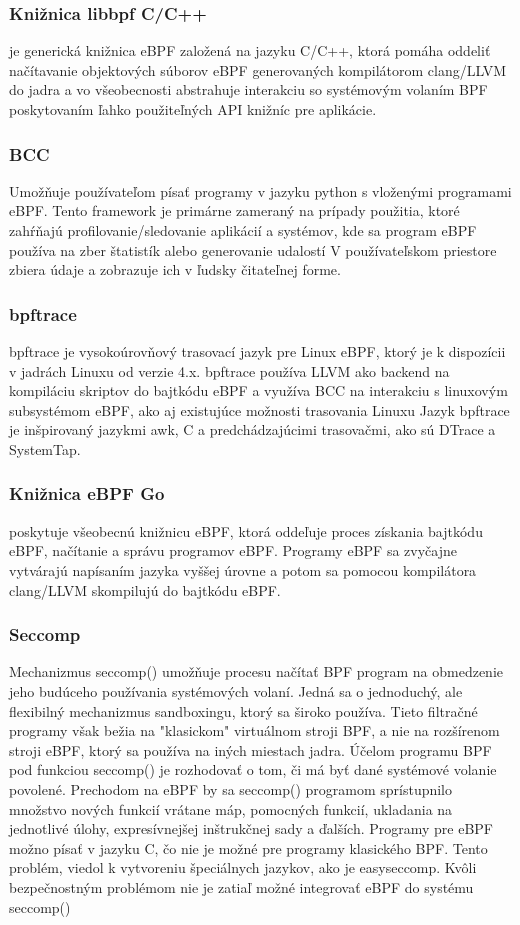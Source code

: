 \subsubsection{Knižnica libbpf C/C++}
je generická knižnica eBPF založená na jazyku C/C++, ktorá pomáha oddeliť načítavanie objektových súborov eBPF generovaných kompilátorom clang/LLVM do jadra a vo všeobecnosti abstrahuje interakciu so systémovým volaním BPF poskytovaním ľahko použiteľných API knižníc pre aplikácie.

\subsubsection{BCC}
Umožňuje používateľom písať programy v jazyku python s vloženými programami eBPF.  
Tento framework je primárne zameraný na prípady použitia, ktoré zahŕňajú profilovanie/sledovanie aplikácií a systémov, kde sa program eBPF používa na zber štatistík alebo generovanie udalostí
V používateľskom priestore zbiera údaje a zobrazuje ich v ľudsky čitateľnej forme. 

\subsubsection{bpftrace}
bpftrace je vysokoúrovňový trasovací jazyk pre Linux eBPF, ktorý je k dispozícii v jadrách Linuxu od verzie 4.x. 
bpftrace používa LLVM ako backend na kompiláciu skriptov do bajtkódu eBPF a využíva BCC na interakciu s linuxovým subsystémom eBPF, ako aj existujúce možnosti trasovania Linuxu
Jazyk bpftrace je inšpirovaný jazykmi awk, C a predchádzajúcimi trasovačmi, ako sú DTrace a SystemTap.

\subsubsection{Knižnica eBPF Go}
poskytuje všeobecnú knižnicu eBPF, ktorá oddeľuje proces získania bajtkódu eBPF, načítanie a správu programov eBPF. 
Programy eBPF sa zvyčajne vytvárajú napísaním jazyka vyššej úrovne a potom sa pomocou kompilátora clang/LLVM skompilujú do bajtkódu eBPF.

\subsubsection{Seccomp}
Mechanizmus seccomp() umožňuje procesu načítať BPF program na obmedzenie jeho budúceho používania systémových volaní.
Jedná sa o jednoduchý, ale flexibilný mechanizmus sandboxingu, ktorý sa široko používa. 
Tieto filtračné programy však bežia na "klasickom" virtuálnom stroji BPF, a nie na rozšírenom stroji eBPF, ktorý sa používa na iných miestach jadra. 
Účelom programu BPF pod funkciou seccomp() je rozhodovať o tom, či má byť dané systémové volanie povolené.
Prechodom na eBPF by sa seccomp() programom sprístupnilo množstvo nových funkcií vrátane máp, pomocných funkcií, ukladania na jednotlivé úlohy, expresívnejšej inštrukčnej sady a ďalších. 
Programy pre eBPF možno písať v jazyku C, čo nie je možné pre programy klasického BPF. 
Tento problém, viedol k vytvoreniu špeciálnych jazykov, ako je easyseccomp. 
Kvôli bezpečnostným problémom nie je zatiaľ možné integrovať eBPF do systému seccomp()

